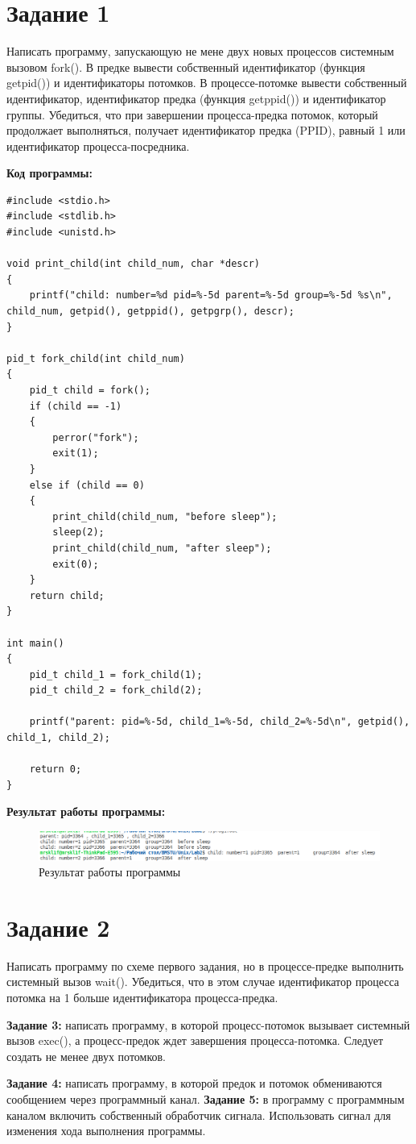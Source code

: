 \documentclass[14pt, a4paper]{extarticle}
\begin{document}
\section*{Задание 1}
Написать программу, запускающую не мене двух новых процессов системным вызовом fork(). В предке вывести собственный идентификатор (функция getpid()) и  идентификаторы потомков. В процессе-потомке вывести собственный идентификатор, идентификатор предка (функция getppid()) и идентификатор группы. Убедиться, что при завершении процесса-предка потомок, который продолжает выполняться, получает идентификатор предка (PPID), равный 1 или идентификатор процесса-посредника.\par
\textbf{Код программы:}
\begin{lstlisting}[label=MultMatrVin, caption=Задание 1]
#include <stdio.h> 
#include <stdlib.h> 
#include <unistd.h>

void print_child(int child_num, char *descr)
{
	printf("child: number=%d pid=%-5d parent=%-5d group=%-5d %s\n", child_num, getpid(), getppid(), getpgrp(), descr);
}

pid_t fork_child(int child_num) 
{
	pid_t child = fork();
	if (child == -1)
	{
		perror("fork");
		exit(1);
	}
	else if (child == 0) 
	{
		print_child(child_num, "before sleep");
		sleep(2);
		print_child(child_num, "after sleep");
		exit(0);
	}
	return child;
}

int main() 
{
	pid_t child_1 = fork_child(1);
	pid_t child_2 = fork_child(2);
	
	printf("parent: pid=%-5d, child_1=%-5d, child_2=%-5d\n", getpid(), child_1, child_2);
	
	return 0;
}
\end{lstlisting}\par
\textbf{Результат работы программы:}\par
\begin{figure}[h!]
	\centering
	\includegraphics[width=\textwidth]{source/1.png}
	\caption{Результат работы программы}
	\label{Example1}
\end{figure}\par

\clearpage
\section{Задание 2} 
Написать программу по схеме первого задания, но в процессе-предке выполнить системный вызов wait(). Убедиться, что в этом случае идентификатор процесса потомка на 1 больше идентификатора процесса-предка.\par
\textbf{Задание 3:} написать программу, в которой процесс-потомок вызывает системный вызов exec(), а процесс-предок ждет завершения процесса-потомка. Следует создать не менее двух потомков.\par
\textbf{Задание 4:} написать программу, в которой предок и потомок обмениваются сообщением через программный канал.
\textbf{Задание 5:} в программу с программным каналом включить собственный обработчик сигнала. Использовать сигнал для изменения хода выполнения программы.
\end{document}
